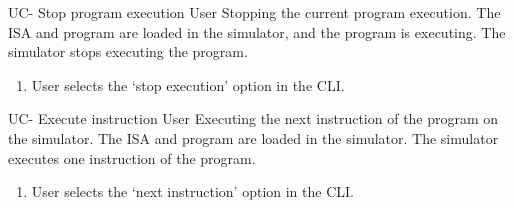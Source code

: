 \begin{useCase}{UC-}
  {Stop program execution}  %
  {User}  %
  {Stopping the current program execution.}  %
  {The \gls{ISA} and program are loaded in the simulator, and the program is executing.}  %
  {The simulator stops executing the program.}  %
  \begin{enumerate}[leftmargin=*, topsep=0pt, noitemsep]  %
    \item User selects the `stop execution' option in the \gls{CLI}.
  \end{enumerate}
\end{useCase}

\begin{useCase}{UC-}
  {Execute instruction}  %
  {User}  %
  {Executing the next instruction of the program on the simulator.}  %
  {The \gls{ISA} and program are loaded in the simulator.}  %
  {The simulator executes one instruction of the program.}  %
  \begin{enumerate}[leftmargin=*, topsep=0pt, noitemsep]  %
    \item User selects the `next instruction' option in the \gls{CLI}.
  \end{enumerate}
\end{useCase}

